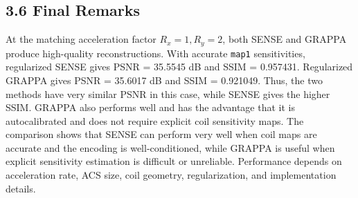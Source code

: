 ﻿\documentclass[11pt]{article}
\begin{document}
\subsection*{3.6 Final Remarks}
At the matching acceleration factor $R_x=1,R_y=2$, both SENSE and GRAPPA produce high-quality reconstructions. With accurate \texttt{map1} sensitivities, regularized SENSE gives PSNR = 35.5545 dB and SSIM = 0.957431. Regularized GRAPPA gives PSNR = 35.6017 dB and SSIM = 0.921049. Thus, the two methods have very similar PSNR in this case, while SENSE gives the higher SSIM. GRAPPA also performs well and has the advantage that it is autocalibrated and does not require explicit coil sensitivity maps. The comparison shows that SENSE can perform very well when coil maps are accurate and the encoding is well-conditioned, while GRAPPA is useful when explicit sensitivity estimation is difficult or unreliable. Performance depends on acceleration rate, ACS size, coil geometry, regularization, and implementation details.

\appendix
\end{document}

